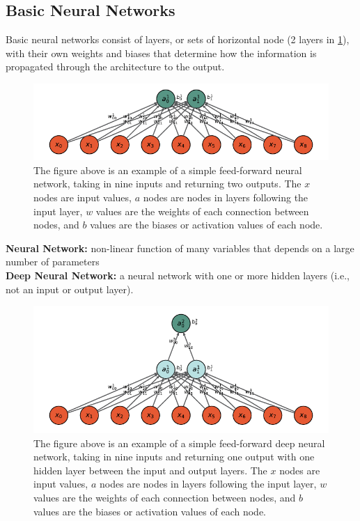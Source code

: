 \subsection{Basic Neural Networks}

Basic neural networks consist of layers, or sets of horizontal node (2 layers in \cref*{fig:basic_NN}), with their own weights and biases that determine how the information is propagated through the architecture to the output. 

\begin{figure}[H]
\centering
\includegraphics{../figures/neural_network.pdf}
\caption{The figure above is an example of a simple feed-forward neural network, taking in nine inputs and returning two outputs. The $x$ nodes are input values, $a$ nodes are nodes in layers following the input layer, $w$ values are the weights of each connection between nodes, and $b$ values are the biases or activation values of each node.}
\label{fig:basic_NN}
\end{figure}

\noindent \textbf{Neural Network:} non-linear function of many variables that depends on a large number of parameters \\
\textbf{Deep Neural Network:} a neural network with one or more hidden layers (i.e., not an input or output layer).

\begin{figure}[H]
\centering
\includegraphics{../figures/DNN.pdf}
\caption{The figure above is an example of a simple feed-forward deep neural network, taking in nine inputs and returning one output with one hidden layer between the input and output layers. The $x$ nodes are input values, $a$ nodes are nodes in layers following the input layer, $w$ values are the weights of each connection between nodes, and $b$ values are the biases or activation values of each node.}
\end{figure}
			
